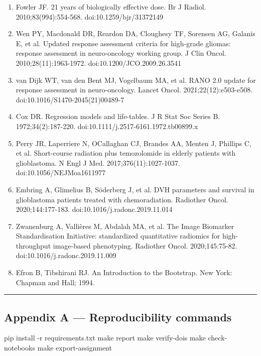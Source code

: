 \documentclass[
  11pt,
]{article}
\newenvironment{Shaded}{}{}
\newcommand{\NormalTok}[1]{#1}
\begin{document}
\begin{enumerate}
  2025. LNCS. Springer; 2025. doi:10.1007/978-3-032-07904-6\_3
\item
  Fowler JF. 21 years of biologically effective dose. Br J Radiol.
  2010;83(994):554-568. doi:10.1259/bjr/31372149
\item
  Wen PY, Macdonald DR, Reardon DA, Cloughesy TF, Sorensen AG, Galanis
  E, et al. Updated response assessment criteria for high-grade gliomas:
  response assessment in neuro-oncology working group. J Clin Oncol.
  2010;28(11):1963-1972. doi:10.1200/JCO.2009.26.3541
\item
  van Dijk WT, van den Bent MJ, Vogelbaum MA, et al. RANO 2.0 update for
  response assessment in neuro-oncology. Lancet Oncol.
  2021;22(12):e503-e508. doi:10.1016/S1470-2045(21)00489-7
\item
  Cox DR. Regression models and life-tables. J R Stat Soc Series B.
  1972;34(2):187-220. doi:10.1111/j.2517-6161.1972.tb00899.x
\item
  Perry JR, Laperriere N, O\textquotesingle Callaghan CJ, Brandes AA,
  Menten J, Phillips C, et al. Short-course radiation plus temozolomide
  in elderly patients with glioblastoma. N Engl J Med.
  2017;376(11):1027-1037. doi:10.1056/NEJMoa1611977
\item
  Embring A, Glimelius B, Söderberg J, et al. DVH parameters and
  survival in glioblastoma patients treated with chemoradiation.
  Radiother Oncol. 2020;144:177-183. doi:10.1016/j.radonc.2019.11.014
\item
  Zwanenburg A, Vallières M, Abdalah MA, et al. The Image Biomarker
  Standardisation Initiative: standardized quantitative radiomics for
  high-throughput image-based phenotyping. Radiother Oncol.
  2020;145:75-82. doi:10.1016/j.radonc.2019.11.009
\item
  Efron B, Tibshirani RJ. An Introduction to the Bootstrap. New York:
  Chapman and Hall; 1994.
\end{enumerate}

\begin{center}\rule{0.5\linewidth}{0.5pt}\end{center}

\subsection{Appendix A --- Reproducibility
commands}\label{appendix-a-reproducibility-commands}

\begin{Shaded}
\begin{Highlighting}[]
\NormalTok{pip install {-}r requirements.txt}
\NormalTok{make report}
\NormalTok{make verify{-}dois}
\NormalTok{make check{-}notebooks}
\NormalTok{make export{-}assignment}
\end{Highlighting}
\end{Shaded}
\end{document}
